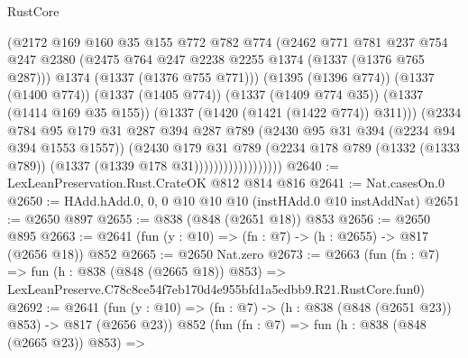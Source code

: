\begin{lexlean}{RustCore}
\begin{coremodule}
                              (@2172
                                @169
                                @160
                                @35
                                @155
                                @772
                                @782
                                @774
                                (@2462
                                  @771
                                  @781
                                  @237
                                  @754
                                  @247
                                  @2380
                                  (@2475 @764 @247 @2238 @2255 @1374 (@1337 (@1376 @765 @287)))
                                  @1374
                                  (@1337 (@1376 @755 @771)))
                                (@1395 (@1396 @774))
                                (@1337 (@1400 @774))
                                (@1337 (@1405 @774))
                                (@1337 (@1409 @774 @35))
                                (@1337 (@1414 @169 @35 @155))
                                (@1337 (@1420 (@1421 (@1422 @774)) @311)))
                              (@2334
                                @784
                                @95
                                @179
                                @31
                                @287
                                @394
                                @287
                                @789
                                (@2430 @95 @31 @394 (@2234 @94 @394 @1553 @1557))
                                (@2430
                                  @179
                                  @31
                                  @789
                                  (@2234
                                    @178
                                    @789
                                    (@1332 (@1333 @789))
                                    (@1337 (@1339 @178 @31))))))))))))))))))
@2640 := LexLeanPreservation.Rust.CrateOK @812 @814 @816
@2641 := Nat.casesOn.{0}
@2650 := HAdd.hAdd.{0, 0, 0} @10 @10 @10 (instHAdd.{0} @10 instAddNat)
@2651 := @2650 @897
@2655 := @838 (@848 (@2651 @18)) @853
@2656 := @2650 @895
@2663 := @2641 (fun (y : @10) => (fn : @7) -> (h : @2655) -> @817 (@2656 @18)) @852
@2665 := @2650 Nat.zero
@2673 := @2663
    (fun (fn : @7) =>
    fun (h : @838 (@848 (@2665 @18)) @853) =>
    LexLeanPreserve.C78c8ce54f7eb170d4e955bfd1a5edbb9.R21.RustCore.fun0)
@2692 := @2641
    (fun (y : @10) => (fn : @7) -> (h : @838 (@848 (@2651 @23)) @853) -> @817 (@2656 @23))
    @852
    (fun (fn : @7) =>
    fun (h : @838 (@848 (@2665 @23)) @853) =>

\end{coremodule}
\end{lexlean}
